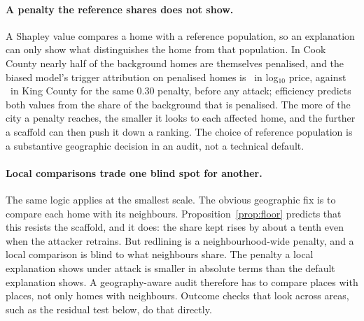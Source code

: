 \paragraph{A penalty the reference shares does not show.} A Shapley value compares a home with a reference
population, so an explanation can only show what distinguishes the home from that population. In Cook County nearly
half of the background homes are themselves penalised, and the biased model's trigger attribution on penalised homes
is \CookFKernelSHAPBiasedSigned\ in log$_{10}$ price, against \FKernelSHAPBiasedSignedFive\ in King County for the same
0.30 penalty, before any attack; efficiency predicts both values from the share of the background that is penalised.
The more of the city a penalty reaches, the smaller it looks to each affected home, and the further a scaffold can
then push it down a ranking. The choice of reference population is a substantive geographic decision in an audit,
not a technical default.

\paragraph{Local comparisons trade one blind spot for another.} The same logic applies at the smallest scale. The
obvious geographic fix is to compare each home with its neighbours. Proposition~\ref{prop:floor} predicts that this resists the scaffold, and it does: the share kept
rises by about a tenth even when the attacker retrains. But redlining is a neighbourhood-wide penalty, and a local
comparison is blind to what neighbours share. The penalty a local explanation shows under attack is smaller in
absolute terms than the default explanation shows. A geography-aware audit therefore has to compare places with places,
not only homes with neighbours. Outcome checks that look across areas, such as the residual test below, do that
directly.

